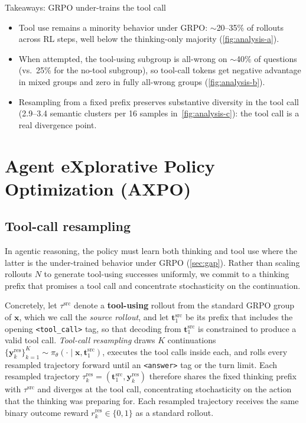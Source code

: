 \documentclass{llmxive}
\providecommand{\bm}[1]{\boldsymbol{#1}}
\providecommand{\toolcall}{\texttt{<tool\_call>}\xspace}
\providecommand{\answer}{\texttt{<answer>}\xspace}
\providecommand{\Toolresample}{Tool-call resampling\xspace}
\providecommand{\vt}{{\bm{t}}}
\providecommand{\vx}{{\bm{x}}}
\providecommand{\vy}{{\bm{y}}}
\begin{document}
\begin{takeawaybox}{Takeaways: GRPO under-trains the tool call}
\begin{itemize}[leftmargin=*, itemsep=1pt, topsep=2pt]
    \item Tool use remains a minority behavior under GRPO: $\sim$20--35\% of rollouts across RL steps, well below the thinking-only majority (\autoref{fig:analysis-a}).
    \item When attempted, the tool-using subgroup is all-wrong on $\sim$40\% of questions (vs.\ 25\% for the no-tool subgroup), so tool-call tokens get negative advantage in mixed groups and zero in fully all-wrong groups (\autoref{fig:analysis-b}).
    \item Resampling from a fixed prefix preserves substantive diversity in the tool call (2.9--3.4 semantic clusters per 16 samples in~\autoref{fig:analysis-c}): the tool call is a real divergence point.
\end{itemize}
\end{takeawaybox}


\section{Agent eXplorative Policy Optimization (AXPO)}
\label{sec:method}

\subsection{\Toolresample}
\label{sec:branching}

In agentic reasoning, the policy must learn both thinking and tool use where the latter is the under-trained behavior under GRPO (\autoref{sec:gap}). Rather than scaling rollouts $N$ to generate tool-using successes uniformly, we commit to a thinking prefix that promises a tool call and concentrate stochasticity on the continuation.

Concretely, let $\tau^{\text{src}}$ denote a \textbf{tool-using} rollout from the standard GRPO group of $\vx$, which we call the \emph{source rollout}, and let $\vt_1^{\text{src}}$ be its prefix that includes the opening \toolcall tag, so that decoding from $\vt_1^{\text{src}}$ is constrained to produce a valid tool call.
\emph{\Toolresample} draws $K$ continuations $\{\vy_k^{\text{res}}\}_{k=1}^{K} \sim \pi_\theta(\cdot \mid \vx, \vt_1^{\text{src}})$, executes the tool calls inside each, and rolls every resampled trajectory forward until an \answer tag or the turn limit. Each resampled trajectory $\tau_k^{\text{res}} = (\vt_1^{\text{src}}, \vy_k^{\text{res}})$ therefore shares the fixed thinking prefix with $\tau^{\text{src}}$ and diverges at the tool call, concentrating stochasticity on the action that the thinking was preparing for. Each resampled trajectory receives the same binary outcome reward $r_k^{\text{res}} \in \{0,1\}$ as a standard rollout.
\end{document}
